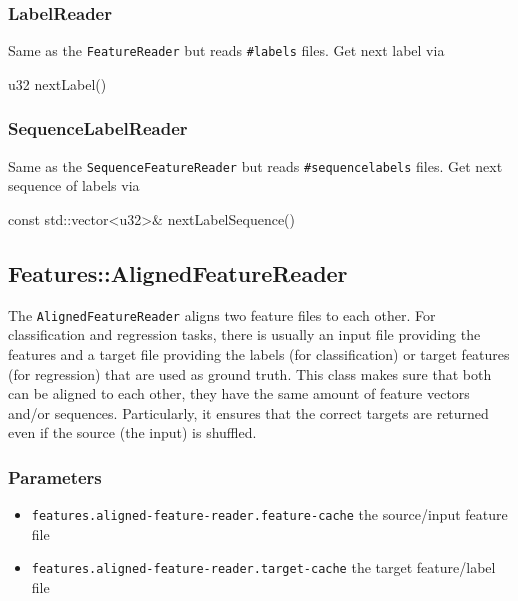 \subsubsection{LabelReader}

Same as the \texttt{FeatureReader} but reads \texttt{\#labels} files. Get next label via

\begin{fdoc}{u32 nextLabel()}
\end{fdoc}

\subsubsection{SequenceLabelReader}

Same as the \texttt{SequenceFeatureReader} but reads \texttt{\#sequencelabels} files. Get next sequence of labels via

\begin{fdoc}{const std::vector<u32>\& nextLabelSequence()}
\end{fdoc}


\subsection{Features::AlignedFeatureReader}


The \texttt{AlignedFeatureReader} aligns two feature files to each other. For classification and regression tasks, there is usually an input file providing the features and a target file providing the labels (for classification) or target features (for regression) that are used as ground truth. This class makes sure that both can be aligned to each other, \ie they have the same amount of feature vectors and/or sequences. Particularly, it ensures that the correct targets are returned even if the source (the input) is shuffled.

\subsubsection*{Parameters}
\begin{itemize}
    \item \texttt{features.aligned-feature-reader.feature-cache} the source/input feature file
    \item \texttt{features.aligned-feature-reader.target-cache} the target feature/label file
\end{itemize}

